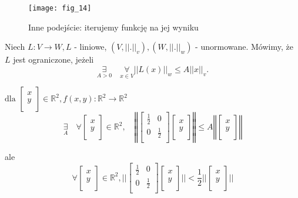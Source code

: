 \documentclass[../main.tex]{subfiles}
\begin{document}
\begin{figure}[h]
    \centering
    \texttt{[image: fig\_14]}
    \caption{Inne podejście: iterujemy funkcję na jej wyniku}
\end{figure}

\begin{definicja}
    Niech $L: V\to W, L$ - liniowe, $(V,||.||_v),(W,||.||_w)$ - unormowane.
    Mówimy, że $L$ jest ograniczone, jeżeli
    \[
        \underset{A>0}{\exists}\quad\underset{x\in V}{\forall} ||L(x)||_w \leq A||x||_v.
    \]
\end{definicja}

\begin{przyklad}


$\text{dla }
\left [ \begin{matrix}
x\\
y\\
\end{matrix}\right ] \in \mathbb{R}^2, f(x,y) : \mathbb{R}^2 \to \mathbb{R}^2$\\
\[
    \underset{A}{\exists}\quad \forall
    \left [ \begin{matrix}
    x\\
    y\\
     \end{matrix}\right ] \in \mathbb{R}^2,\quad \left\Vert \left [ \begin{matrix}
    \frac{1}{2} &0\\
    0 &\frac{1}{2}\\
     \end{matrix}\right ]
    \left [ \begin{matrix}
    x\\
    y\\ \end{matrix}\right ] \right\Vert
    \leq A \left\Vert \left [ \begin{matrix}
    x\\
    y\\ \end{matrix}\right ]
    \right\Vert
\]

ale
\[
    \forall \left [ \begin{matrix}
    x\\
    y\\
     \end{matrix}\right ] \in \mathbb{R}^2, \Bigg | \Bigg |
    \left [ \begin{matrix}
    \frac{1}{2} &0\\
    0 & \frac{1}{2}\\
     \end{matrix}\right ]
    \left [ \begin{matrix} x\\
    y\\ \end{matrix}\right ]
    \Bigg | \Bigg | < \frac{1}{2} \Bigg | \Bigg |  \left [ \begin{matrix}
    x\\
    y\\ \end{matrix}\right ] \Bigg | \Bigg|
\]
\end{przyklad}
\end{document}
